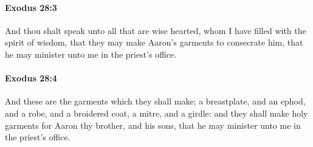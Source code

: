		\paragraph{Exodus 28:3} %
			\label{EXODUS-28-3}

			And thou shalt speak unto all that are wise hearted, whom I have filled with the spirit of wisdom, that they may make Aaron's garments to consecrate him, that he may minister unto me in the priest's office.


		\paragraph{Exodus 28:4} %
			\label{EXODUS-28-4}

			And these are the garments which they shall make; a breastplate, and an ephod, and a robe, and a broidered coat, a mitre, and a girdle: and they shall make holy garments for Aaron thy brother, and his sons, that he may minister unto me in the priest's office.

